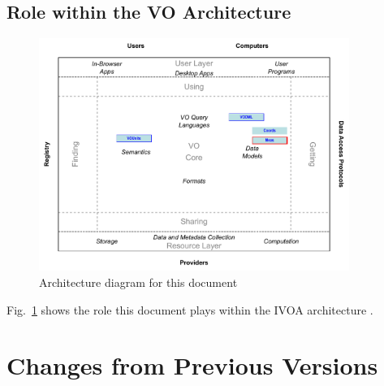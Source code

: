 \documentclass[11pt,a4paper]{ivoa}
\begin{document}
\pagebreak
\subsection{Role within the VO Architecture}

\begin{figure}[h]
\centering


\includegraphics[width=0.9\textwidth]{role_diagram.pdf}
\caption{Architecture diagram for this document}
\label{fig:archdiag}
\end{figure}

Fig.~\ref{fig:archdiag} shows the role this document plays within the
IVOA architecture \citep{note:VOARCH}.




\pagebreak
\appendix
\section{Changes from Previous Versions}


\end{document}
